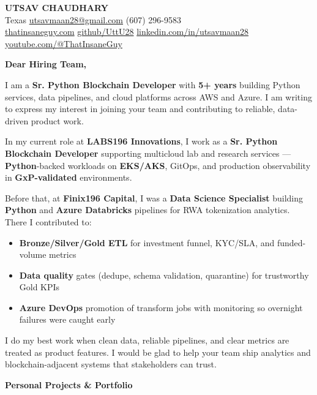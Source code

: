 \documentclass[10pt, letterpaper]{article}
\begin{document}
\begin{center}
    {\LARGE \textbf{UTSAV CHAUDHARY}}\\[4pt]
    \normalsize
    Texas \textbar{} \href{mailto:utsavmaan28@gmail.com}{utsavmaan28@gmail.com} \textbar{} (607) 296-9583\\
    \href{https://thatinsaneguy28.netlify.app/}{thatinsaneguy.com} \textbar{}
    \href{https://github.com/UttU28/}{github/UttU28} \textbar{}
    \href{https://www.linkedin.com/in/utsavmaan28}{linkedin.com/in/utsavmaan28} \textbar{}
    \href{https://www.youtube.com/@ThatInsaneGuy}{youtube.com/@ThatInsaneGuy}
\end{center}

\vspace{0.6cm}

\textbf{Dear Hiring Team,}

I am a \textbf{Sr. Python Blockchain Developer} with \textbf{5+ years} building Python services, data pipelines, and cloud platforms across AWS and Azure. I am writing to express my interest in joining your team and contributing to reliable, data-driven product work.

In my current role at \textbf{LABS196 Innovations}, I work as a \textbf{Sr. Python Blockchain Developer} supporting multicloud lab and research services — \textbf{Python}-backed workloads on \textbf{EKS/AKS}, GitOps, and production observability in \textbf{GxP-validated} environments.

Before that, at \textbf{Finix196 Capital}, I was a \textbf{Data Science Specialist} building \textbf{Python} and \textbf{Azure Databricks} pipelines for RWA tokenization analytics. There I contributed to:
\begin{itemize}
    \item \textbf{Bronze/Silver/Gold ETL} for investment funnel, KYC/SLA, and funded-volume metrics
    \item \textbf{Data quality} gates (dedupe, schema validation, quarantine) for trustworthy Gold KPIs
    \item \textbf{Azure DevOps} promotion of transform jobs with monitoring so overnight failures were caught early
\end{itemize}

I do my best work when clean data, reliable pipelines, and clear metrics are treated as product features. I would be glad to help your team ship analytics and blockchain-adjacent systems that stakeholders can trust.

\textbf{Personal Projects \& Portfolio}
\end{document}
